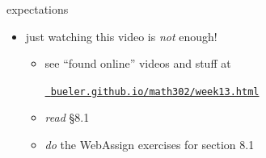 \documentclass[urlcolor=blue,dvipsnames]{beamer}
\begin{document}
\begin{frame}{expectations}

\begin{itemize}
\item just watching this video is \emph{not} enough!
     \begin{itemize}
     \item see ``found online'' videos and stuff at

     \centerline{\href{https://bueler.github.io/math302/week13.html}{\tt \color{cyan} bueler.github.io/math302/week13.html}}
     \item \emph{read} \S8.1
     \item \emph{do} the WebAssign exercises for section 8.1
     \end{itemize}
\end{itemize}
\end{frame}
\end{document}
